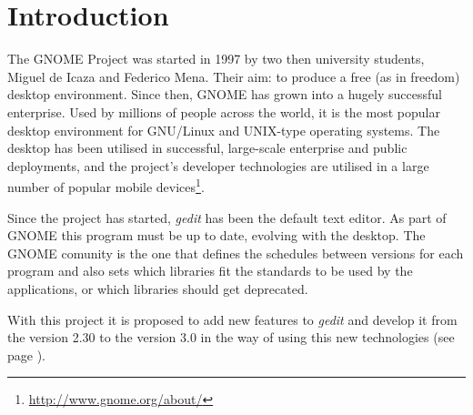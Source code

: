 
\chapter{Introduction}

The GNOME Project was started in 1997 by two then university students, Miguel de Icaza and Federico Mena. Their aim: to produce a free (as in freedom) desktop environment. Since then, GNOME has grown into a hugely successful enterprise. Used by millions of people across the world, it is the most popular desktop environment for GNU/Linux and UNIX-type operating systems. The desktop has been utilised in successful, large-scale enterprise and public deployments, and the project’s developer technologies are utilised in a large number of popular mobile devices\footnote{\url{http://www.gnome.org/about/}}.

Since the project has started, \emph{gedit} has been the default text editor. As part of GNOME this program must be up to date, evolving with the desktop. The GNOME comunity is the one that defines the schedules between versions for each program and also sets which libraries fit the standards to be used by the applications, or which libraries should get deprecated.

With this project it is proposed to add new features to \emph{gedit} and develop it from the version 2.30 to the version 3.0 in the way of using this new technologies (see page \pageref{Technologies}).
